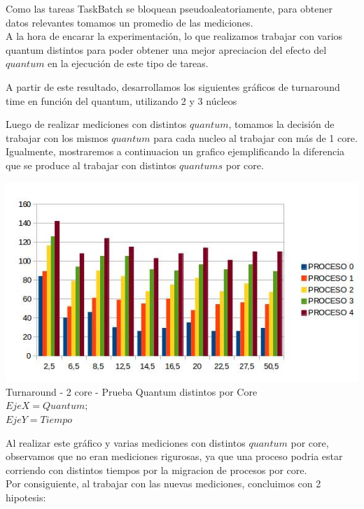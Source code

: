 \indent \indent Como las tareas TaskBatch se bloquean pseudoaleatoriamente, 
para obtener datos relevantes tomamos un promedio de las mediciones.\\
\indent A la hora de encarar la experimentación, lo que realizamos trabajar con
varios quantum distintos para poder obtener una mejor apreciacion 
del efecto del $quantum$ en la ejecución de este tipo de tareas. 

\indent A partir de este resultado, desarrollamos los siguientes gráficos de turnaround time 
en función del quantum, utilizando 2 y 3 núcleos

\indent Luego de realizar mediciones con distintos $quantum$,
tomamos la decisión de trabajar con los mismos $quantum$ para cada nucleo
al trabajar con más de 1 core. Igualmente, mostraremos a continuacion un grafico
ejemplificando la diferencia que se produce al trabajar con distintos $quantums$ por
core.\\

\begin{center}
    	\includegraphics[width=1\textwidth]{./EJ7/turnarounddistquan.png}
	{Turnaround - 2 core - Prueba Quantum distintos por Core}\\
	{$Eje X = Quantum; $\\$ Eje Y = Tiempo$}\\
 \end{center}

\indent Al realizar este gráfico y varias mediciones con distintos $quantum$ 
por core, observamos que no eran mediciones rigurosas, 
ya que una proceso podria estar corriendo con distintos tiempos por la
migracion de procesos por core.\\

 \indent Por consiguiente, al trabajar con las nuevas mediciones, 
 concluimos con 2 hipotesis:
 
